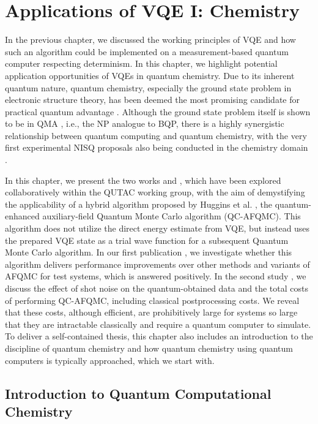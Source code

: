 \documentclass[../main.tex]{subfiles}
\begin{document}
\chapter{Applications of VQE I: Chemistry}\label{chap:chem}

In the previous chapter, we discussed the working principles of VQE and how such an algorithm could be implemented on a measurement-based quantum computer respecting determinism. In this chapter, we highlight potential application opportunities of VQEs in quantum chemistry. Due to its inherent quantum nature, quantum chemistry, especially the ground state problem in electronic structure theory, has been deemed the most promising candidate for practical quantum advantage \cite{cao2019quantum}. Although the ground state problem itself is shown to be in QMA \cite{kempe2004complexity}, i.e., the NP analogue to BQP, there is a highly synergistic relationship between quantum computing and quantum chemistry, with the very first experimental NISQ proposals also being conducted in the chemistry domain \cite{peruzzo2014variational}. 

In this chapter, we present the two works \cite{amsler2023classical} and \cite{kiser2024classical}, which have been explored collaboratively within the \ac{QUTAC} working group, with the aim of demystifying the applicability of a hybrid algorithm proposed by Huggins et al.  \cite{huggins2022unbiasing}, the quantum-enhanced auxiliary-field Quantum Monte Carlo algorithm (QC-AFQMC). This algorithm does not utilize the direct energy estimate from VQE, but instead uses the prepared VQE state as a trial wave function for a subsequent Quantum Monte Carlo algorithm. In our first publication \cite{amsler2023classical}, we investigate whether this algorithm delivers performance improvements over other methods and variants of \ac{AFQMC} for test systems, which is answered positively. In the second study \cite{kiser2024classical}, we discuss the effect of shot noise on the quantum-obtained data and the total costs of performing QC-AFQMC, including classical postprocessing costs. We reveal that these costs, although efficient, are prohibitively large for systems so large that they are intractable classically and require a quantum computer to simulate.
To deliver a self-contained thesis, this chapter also includes an introduction to the discipline of quantum chemistry and how quantum chemistry using quantum computers is typically approached, which we start with.


\section{Introduction to Quantum Computational Chemistry}\label{sec:introquantumchem}
\end{document}
